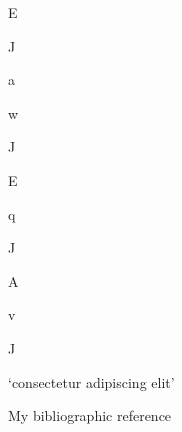 \documentclass[12pt,twoside,openany]{book}
\newenvironment{lateiDocument}{}{}
\begin{document}
\begin{lateiDocument}
\begin{teiElement}[name={TEI}]
\begin{teiElement}[name={text},xmlid={text-001}]
\begin{teiElement}[name={body},xmlid={body-001}]
\begin{teiDiv}[type={section1},xmlid={section1-011}]
\begin{teiDiv}[type={section2},xmlid={section2-018}]
\begin{teiCit}[type={linguistic},xmlid={cit04}]
\begin{teiQuote}
\begin{teiQuote}[type={example}]
								\begin{teiElement}[name={seg}]
E
\end{teiElement}
								\begin{teiElement}[name={seg}]
J
\end{teiElement}
								\begin{teiElement}[name={seg}]
a
\end{teiElement}
								\begin{teiElement}[name={seg}]
w
\end{teiElement}
								\begin{teiElement}[name={seg}]
J
\end{teiElement}
							
\end{teiQuote}
							\begin{teiElement}[name={gloss}]

								\begin{teiElement}[name={seg}]
E
\end{teiElement}
								\begin{teiElement}[name={seg}]
q
\end{teiElement}
								\begin{teiElement}[name={seg}]
J
\end{teiElement}
								\begin{teiElement}[name={seg}]
A
\end{teiElement}
								\begin{teiElement}[name={seg}]
v
\end{teiElement}
								\begin{teiElement}[name={seg}]
J
\end{teiElement}
							
\end{teiElement}
							\begin{teiQuote}[type={trl}]
‘consectetur adipiscing elit’
\end{teiQuote}
							\begin{teiBibl}[xmlid={bibl-016}]
My bibliographic reference
\end{teiBibl}
						
\end{teiQuote}
					
\end{teiCit}
				
\end{teiDiv}
			
\end{teiDiv}
		

\end{teiElement}
\end{teiElement}
\end{teiElement}
\end{lateiDocument}
\end{document}
